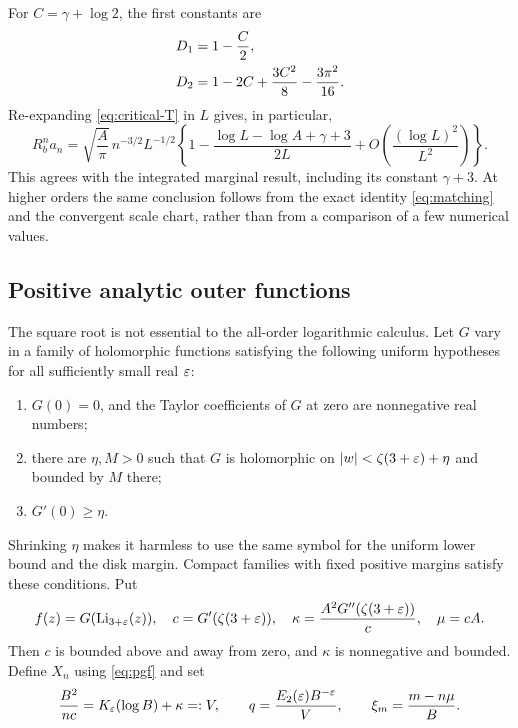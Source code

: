 For $C=\gamma+\log2$, the first constants are
\begin{align}
 D_1&=1-\frac C2,\notag\\
 D_2&=1-2C+\frac{3C^2}{8}-\frac{3\pi^2}{16}.
 \label{eq:D-first}
\end{align}
Re-expanding \eqref{eq:critical-T} in $L$ gives, in particular,
\begin{equation}\label{eq:marginal-old-first}
 R_b^n a_n=\sqrt{\frac A\pi}\,n^{-3/2}L^{-1/2}
 \left\{1-\frac{\log L-\log A+\gamma+3}{2L}
              +O\left(\frac{(\log L)^2}{L^2}\right)\right\}.
\end{equation}
This agrees with the integrated marginal result, including its
constant $\gamma+3$. At higher orders the same conclusion follows
from the exact identity \eqref{eq:matching} and the convergent scale
chart, rather than from a comparison of a few numerical values.

\subsection{Positive analytic outer functions}

The square root is not essential to the all-order logarithmic
calculus. Let $G$ vary in a family of holomorphic functions satisfying
the following uniform hypotheses for all sufficiently small real
$\varepsilon$:
\begin{enumerate}[label=(\roman*)]
\item $G(0)=0$, and the Taylor coefficients of $G$ at zero are
nonnegative real numbers;
\item there are $\eta,M>0$ such that $G$ is holomorphic on
$|w|<\zeta(3+\varepsilon)+\eta$ and bounded by $M$ there;
\item $G'(0)\ge\eta$.
\end{enumerate}
Shrinking $\eta$ makes it harmless to use the same symbol for the
uniform lower bound and the disk margin. Compact families with fixed
positive margins satisfy these conditions. Put
\begin{equation}\label{eq:G-parameters}
 f(z)=G(\operatorname{Li}_{3+\varepsilon}(z)),\quad
 c=G'(\zeta(3+\varepsilon)),\quad
 \kappa=\frac{A^2G''(\zeta(3+\varepsilon))}{c},\quad \mu=cA.
\end{equation}
Then $c$ is bounded above and away from zero, and $\kappa$ is
nonnegative and bounded. Define $X_n$ using \eqref{eq:pgf} and set
\begin{equation}\label{eq:G-scale}
 \frac{B^2}{nc}=K_\varepsilon(\log B)+\kappa=:V,
 \qquad q=\frac{E_2(\varepsilon)B^{-\varepsilon}}{V},\qquad
 \xi_m=\frac{m-n\mu}{B}.
\end{equation}

